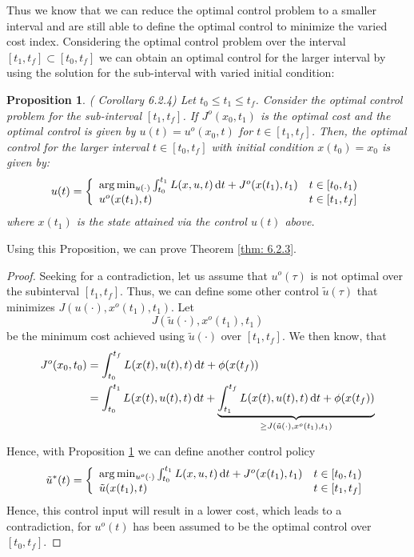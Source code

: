 \documentclass[paper=a4, pagesize, DIV=calc, BCOR=12.5mm, twoside=on, onecolumn=on, open = any, titlepage =on, parskip =half-, headsepline = on, footsepline = on, chapterprefix = on, appendixprefix = off, fontsize = 12pt, numbers = noenddot, abstract = on]{scrbook}
\numberwithin{equation}{chapter}
\theoremstyle{definition}
\theoremstyle{plain}
\theoremstyle{plain}
\theoremstyle{remark}
\theoremstyle{plain}
\theoremstyle{plain}
\newtheorem{prop}{Proposition}
\begin{document}
Thus we know that we can reduce the optimal control problem to a smaller interval and are still able to define the optimal control to minimize the varied cost index. 
Considering the optimal control problem over the interval $\left[ t_1, t_f \right] \subset \left[ t_0, t_f \right]$ we can obtain an optimal control for the larger interval by using the solution for the sub-interval with varied initial condition:
\begin{prop} (\cite{li:2006} Corollary 6.2.4) \label{cor:6.2.4}
Let $t_0 \le t_1 \le t_f$. Consider the optimal control problem for the sub-interval $\left[ t_1, t_f \right]$. If $J^o(x_0, t_1)$ is the optimal cost and the optimal control is given by $u(t) = u^o(x_0, t) $ for $t \in \left[ t_1, t_f \right]$. Then, the optimal control for the larger interval $ t \in \left[ t_0, t_f \right]$ with initial condition $x(t_0) = x_0$ is given by: 
\begin{equation}
u(t) = 
\left\{
\begin{array}{ll}
	\mathrm{arg} \min_{u(\cdot )} \int_{t_0}^{t_1} L(x, u, t) \mathop{}\!\mathrm{d} t + J^o(x(t_1),t_1)& t \in \left[t_0, t_1\right)\\
	u^o(x(t_1),t) & t \in \left[ t_1, t_f \right]
\end{array}
\right.
\end{equation}
where $x(t_1)$ is the state attained via the control $u(t)$ above.
\end{prop}
Using this Proposition, we can prove Theorem \ref{thm: 6.2.3}.
\begin{proof}
Seeking for a contradiction, let us assume that $u^o(\tau)$ is not optimal over the subinterval $\left[t_1, t_f \right]$. Thus, we can define some other control $\tilde{u}(\tau)$ that minimizes $J(u(\cdot), x^o(t_1), t_1)$. Let \[ J(\tilde{u}(\cdot),x^o(t_1),t_1)\] be the minimum cost achieved using $\tilde{u}(\cdot)$ over $\left[t_1, t_f \right]$. We then know, that
\begin{align*}
J^o(x_0,t_0) &= \int_{t_0}^{t_f} L(x(t), u(t), t) \mathop{}\!\mathrm{d} t + \phi(x(t_f))\\
&= \int_{t_0}^{t_1} L(x(t),u(t),t) \mathop{}\!\mathrm{d} t + \underbrace{\int_{t_1}^{t_f} L(x(t),u(t),t)\mathop{}\!\mathrm{d} t + \phi(x(t_f))}_{\geq J(\tilde{u}(\cdot),x^o(t_1),t_1)}\\
\end{align*}

Hence, with Proposition \ref{cor:6.2.4} we can define another control policy 
\begin{equation*}
\tilde{u}^*(t) = 
\left\{
\begin{array}{ll}
	\mathrm{arg} \min_{u^o(\cdot )} \int_{t_0}^{t_1} L(x, u, t) \mathop{}\!\mathrm{d} t + J^o(x(t_1),t_1)& t \in \left[t_0, t_1\right)\\
	\tilde{u}(x(t_1),t) & t \in \left[ t_1, t_f \right]
\end{array}
\right.
\end{equation*}
Hence, this control input will result in a lower cost, which leads to a contradiction, for $u^o(t)$ has been assumed to be the optimal control over $\left[t_0,t_f\right]$.
\end{proof}
\par \singlespacing
\end{document}
